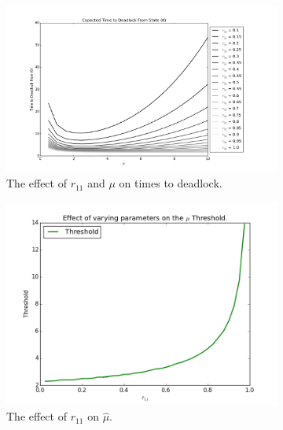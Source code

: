 \documentclass{article}
\begin{document}
\begin{figure}[!htbp]
  \begin{subfigure}[b]{0.5\textwidth}
    \includegraphics[width=\textwidth]{images/varymur11}
    \caption{The effect of $r_{11}$ and $\mu$ on times to deadlock.}
    \label{fig:varymuandr}
  \end{subfigure}
  \begin{subfigure}[b]{0.5\textwidth}
    \includegraphics[width=\textwidth]{images/plot_thresholds_r11}
    \caption{The effect of $r_{11}$ on $\hat{\mu}$.}
    \label{fig:threshold_r11}
  \end{subfigure}
  \begin{subfigure}[b]{0.5\textwidth}

\end{subfigure}
\end{figure}
\end{document}
